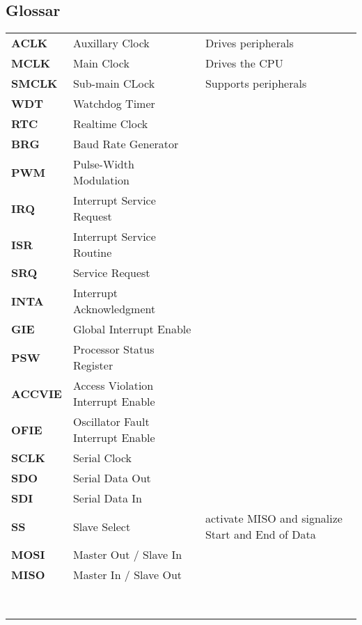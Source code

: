 \subsection*{Glossar}
\begin{tabular}{>{\bfseries}lll}
    ACLK    & Auxillary Clock   & Drives peripherals\\
    MCLK    & Main Clock        & Drives the CPU \\
    SMCLK   & Sub-main CLock    & Supports peripherals\\
    WDT     & Watchdog Timer    & \\
    RTC     & Realtime Clock    & \\
    BRG     & Baud Rate Generator& \\
    PWM     & Pulse-Width Modulation& \\
    IRQ     & Interrupt Service Request& \\
    ISR     & Interrupt Service Routine& \\
    SRQ     & Service Request   & \\
    INTA    & Interrupt Acknowledgment& \\
    GIE     & Global Interrupt Enable & \\
    PSW     & Processor Status Register & \\
    ACCVIE  & Access Violation Interrupt Enable & \\
    OFIE    & Oscillator Fault Interrupt Enable & \\
    SCLK    & Serial Clock      & \\
    SDO     & Serial Data Out   & \\
    SDI     & Serial Data In    & \\
    SS      & Slave Select      & activate MISO and signalize Start and End of Data\\
    MOSI    & Master Out / Slave In & \\
    MISO    & Master In / Slave Out & \\
    & & \\
    & & \\
    & & \\
    & & \\
    & & \\
    & & \\
    & & \\
    & & \\
\end{tabular}
